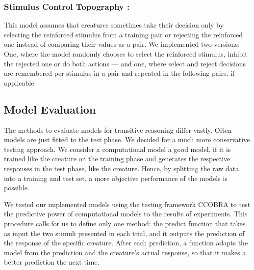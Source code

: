 \documentclass[10pt,letterpaper]{article}
\newcommand{\todo}[1]{{\color{todocolor} \bfseries #1}}
\begin{document}
	\subsubsection{Stimulus Control Topography \cite{mcilvane2003}:} This model assumes that creatures sometimes take their decision only by selecting the reinforced stimulus from a training pair or rejecting the reinforced one instead of comparing their values as a pair. We implemented two versions: One, where the model randomly chooses to select the reinforced stimulus, inhibit the rejected one or do both actions --- and one, where select and reject decisions are remembered per stimulus in a pair and repeated in the following pairs, if applicable. 
	
	\subsection{Model Evaluation}
	The methods to evaluate models for transitive reasoning differ vastly. Often models are just fitted to the test phase. We decided for a much more conservative testing approach. We consider a computational model a good model, if it is trained like the creature on the training phase and generates the respective responses in the test phase, like the creature. Hence, by splitting the raw data into a training and test set, a more objective performance of the models is possible. 
	
	We tested our implemented models using the testing framework CCOBRA to test the predictive power of computational models to the results of experiments.  This procedure calls for us to define only one method: the predict function that takes as input the two stimuli presented in each trial, and it outputs the prediction of the response of the specific creature. After each prediction, a function adapts the model from the prediction and the creature's actual response, so that it makes a better prediction the next time.
	
	
\end{document}
